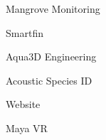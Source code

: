 \item Mangrove Monitoring
\item Smartfin
\item Aqua3D Engineering
\item Acoustic Species ID
\item Website
\item Maya VR
